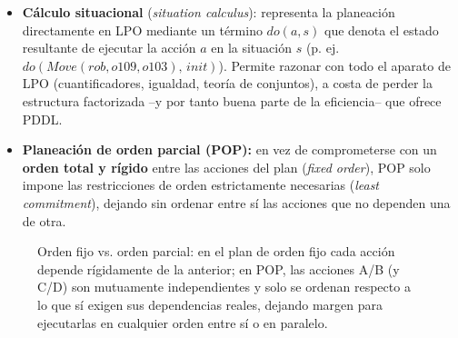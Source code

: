 \begin{itemize}
\begin{figure}[H]
    \caption{Grafo de planeación (esquemático): las líneas sólidas verticales son \textit{acciones
    de persistencia} (un literal verdadero puede seguir siéndolo sin ninguna acción que lo cambie);
    la línea punteada representa una acción real que conecta una precondición en $S_0$ con un efecto
    en $S_1$. Cada capa $S_i$ acumula todos los literales alcanzables en $i$ pasos o menos.}
    \end{figure}
    \item \textbf{Cálculo situacional} (\textit{situation calculus}): representa la planeación
    directamente en LPO mediante un término $do(a,s)$ que denota el estado resultante de ejecutar la
    acción $a$ en la situación $s$ (p. ej. $do(Move(rob,o109,o103),\,init)$). Permite razonar con todo
    el aparato de LPO (cuantificadores, igualdad, teoría de conjuntos), a costa de perder la
    estructura factorizada --y por tanto buena parte de la eficiencia-- que ofrece PDDL.
    \item \textbf{Planeación de orden parcial (POP):} en vez de comprometerse con un \textbf{orden
    total y rígido} entre las acciones del plan (\textit{fixed order}), POP solo impone las
    restricciones de orden estrictamente necesarias (\textit{least commitment}), dejando sin ordenar
    entre sí las acciones que no dependen una de otra.
\end{itemize}

\begin{figure}[H]
\centering
{}
\caption{Orden fijo vs. orden parcial: en el plan de orden fijo cada acción depende rígidamente de la
anterior; en POP, las acciones A/B (y C/D) son mutuamente independientes y solo se ordenan respecto a
lo que sí exigen sus dependencias reales, dejando margen para ejecutarlas en cualquier orden entre sí
o en paralelo.}
\end{figure}
